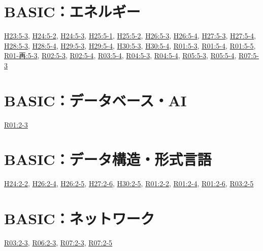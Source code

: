 \section{BASIC：エネルギー}
\hyperref[q:h23-reg-basic-5-3]{H23:5-3}, \hyperref[q:h24-reg-basic-5-2]{H24:5-2}, \hyperref[q:h24-reg-basic-5-3]{H24:5-3}, \hyperref[q:h25-reg-basic-5-1]{H25:5-1}, \hyperref[q:h25-reg-basic-5-2]{H25:5-2}, \hyperref[q:h26-reg-basic-5-3]{H26:5-3}, \hyperref[q:h26-reg-basic-5-4]{H26:5-4}, \hyperref[q:h27-reg-basic-5-3]{H27:5-3}, \hyperref[q:h27-reg-basic-5-4]{H27:5-4}, \hyperref[q:h28-reg-basic-5-3]{H28:5-3}, \hyperref[q:h28-reg-basic-5-4]{H28:5-4}, \hyperref[q:h29-reg-basic-5-3]{H29:5-3}, \hyperref[q:h29-reg-basic-5-4]{H29:5-4}, \hyperref[q:h30-reg-basic-5-3]{H30:5-3}, \hyperref[q:h30-reg-basic-5-4]{H30:5-4}, \hyperref[q:r01-reg-basic-5-3]{R01:5-3}, \hyperref[q:r01-reg-basic-5-4]{R01:5-4}, \hyperref[q:r01-reg-basic-5-5]{R01:5-5}, \hyperref[q:r01-ret-basic-5-3]{R01-再:5-3}, \hyperref[q:r02-reg-basic-5-3]{R02:5-3}, \hyperref[q:r02-reg-basic-5-4]{R02:5-4}, \hyperref[q:r03-reg-basic-5-4]{R03:5-4}, \hyperref[q:r04-reg-basic-5-3]{R04:5-3}, \hyperref[q:r04-reg-basic-5-4]{R04:5-4}, \hyperref[q:r05-reg-basic-5-3]{R05:5-3}, \hyperref[q:r05-reg-basic-5-4]{R05:5-4}, \hyperref[q:r07-reg-basic-5-3]{R07:5-3}
\section{BASIC：データベース・AI}
\hyperref[q:r01-reg-basic-2-3]{R01:2-3}
\section{BASIC：データ構造・形式言語}
\hyperref[q:h24-reg-basic-2-2]{H24:2-2}, \hyperref[q:h26-reg-basic-2-4]{H26:2-4}, \hyperref[q:h26-reg-basic-2-5]{H26:2-5}, \hyperref[q:h27-reg-basic-2-6]{H27:2-6}, \hyperref[q:h30-reg-basic-2-5]{H30:2-5}, \hyperref[q:r01-reg-basic-2-2]{R01:2-2}, \hyperref[q:r01-reg-basic-2-4]{R01:2-4}, \hyperref[q:r01-reg-basic-2-6]{R01:2-6}, \hyperref[q:r03-reg-basic-2-5]{R03:2-5}
\section{BASIC：ネットワーク}
\hyperref[q:r03-reg-basic-2-3]{R03:2-3}, \hyperref[q:r06-reg-basic-2-3]{R06:2-3}, \hyperref[q:r07-reg-basic-2-3]{R07:2-3}, \hyperref[q:r07-reg-basic-2-5]{R07:2-5}
